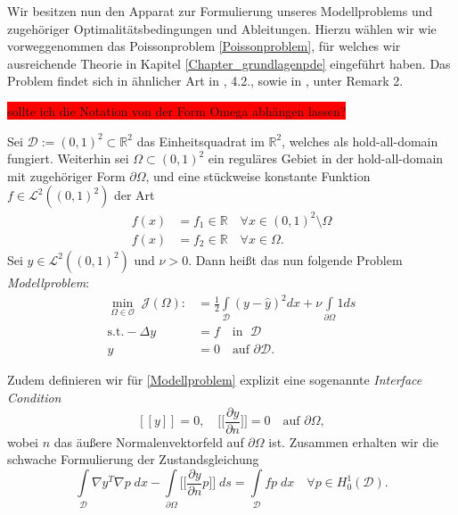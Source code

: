 Wir besitzen nun den Apparat zur Formulierung unseres Modellproblems und zugehöriger Optimalitätsbedingungen und Ableitungen. Hierzu wählen wir wie vorweggenommen das Poissonproblem \ref{Poissonproblem}, für welches wir ausreichende Theorie in Kapitel \ref{Chapter_grundlagenpde} eingeführt haben. Das Problem findet sich in ähnlicher Art in \cite{shape_space}, 4.2., sowie in \cite{LagrangeNewton}, unter Remark 2.

\colorbox{red}{sollte ich die Notation von der Form Omega abhängen lassen?}
\begin{defi}[Modellproblem]
	Sei $\mathcal{D} := (0,1)^2 \subset \mathbb{R}^2$ das Einheitsquadrat im $\mathbb{R}^2$, welches als hold-all-domain fungiert.
	Weiterhin sei $\Omega \subset (0,1)^2$ ein reguläres Gebiet in der hold-all-domain mit zugehöriger Form $\partial\Omega$, und eine stückweise konstante Funktion $f \in \mathcal{L}^2((0,1)^2)$ der Art
	\begin{align*}
		f(x) &= f_1 \in \mathbb{R} \quad \forall x \in (0,1)^2\setminus \Omega \\
		f(x) &= f_2 \in \mathbb{R} \quad \forall x \in \Omega.
	\end{align*}
	Sei $\hat{y} \in \mathcal{L}^2((0,1)^2)$ und $\nu > 0$. Dann heißt das nun folgende Problem \textit{Modellproblem}:
	\begin{equation}\label{Modellproblem}
	\begin{aligned}
	\underset{\Omega\in \mathcal{O}}{\min}\; \mathcal{J}(\Omega) :&= \frac{1}{2}\underset{\mathcal{D}}{\int} (y - \hat{y})^2 dx + \nu\underset{\partial\Omega}{\int} 1 ds \\
	\text{s.t.} -\Delta y &= f \quad \text{in } \;\mathcal{D} \\
	y &= 0  \quad \text{auf } \partial\mathcal{D}.
	\end{aligned}
	\end{equation}		
	
	Zudem definieren wir für \ref{Modellproblem} explizit eine sogenannte \textit{Interface Condition}
	\begin{equation}\label{Interfacecondition}
		[[y]] = 0, \quad \Big[\Big[\frac{\partial y}{\partial n}\Big]\Big] = 0 \quad \text{auf } \partial \Omega,
	\end{equation}
	wobei $n$ das äußere Normalenvektorfeld auf $\partial\Omega$ ist.	Zusammen erhalten wir die schwache Formulierung der Zustandsgleichung
	\begin{equation}
		\underset{\mathcal{D}}{\int} \nabla y^T \nabla p\; dx - \underset{\partial\Omega}{\int} \Big[\Big[ \frac{\partial y}{\partial n}p\Big]\Big]\;ds = \underset{\mathcal{D}}{\int} fp \;dx \quad \forall p \in H^1_0(\mathcal{D}).
	\end{equation}
	

\end{defi}
